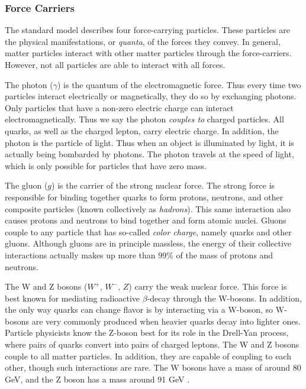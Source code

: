\subsubsection*{Force Carriers}
The standard model describes four force-carrying particles. These
particles are the physical manifestations, or \emph{quanta}, of the forces
they convey. In general, matter particles interact with other matter
particles through the force-carriers. However, not all particles are
able to interact with all forces.

The photon ($\gamma$) is the quantum of the electromagnetic
force. Thus every time two particles interact electrically or
magnetically, they do so by exchanging photons. Only particles that
have a non-zero electric charge can interact electromagnetically. Thus
we say the photon \emph{couples to} charged particles. All quarks, as
well as the charged lepton, carry electric charge. In addition, the
photon is the particle of light. Thus when an object is illuminated by
light, it is actually being bombarded by photons. The photon travels
at the speed of light, which is only possible for particles that have
zero mass.

The gluon ($g$) is the carrier of the strong nuclear force. The strong
force is responsible for binding together quarks to form protons,
neutrons, and other composite particles (known collectively as
\emph{hadrons}). This same interaction also causes protons and neutrons to
bind together and form atomic nuclei. Gluons couple to any particle
that has so-called \emph{color charge}, namely quarks and
other gluons. Although gluons are in principle massless, the energy of
their collective interactions actually makes up more than 99\% of the
mass of protons and neutrons.

The W and Z bosons ($W^+$, $W^-$, $Z$) carry the weak nuclear force. This
force is best known for mediating radioactive $\beta$-decay through
the W-bosons. In addition, the only way quarks can change flavor is by
interacting via a W-boson, so W-bosons are very commonly produced when
heavier quarks decay into lighter ones.
Particle physicists know the Z-boson best for its
role in the Drell-Yan process, where pairs of quarks convert into
pairs of charged leptons. The W and Z bosons couple to all matter
particles. In addition, they are capable of coupling to each other,
though such interactions are rare. The W bosons have a mass of around
80 GeV, and the Z boson has a mass around 91 GeV \cite{pdg}.

